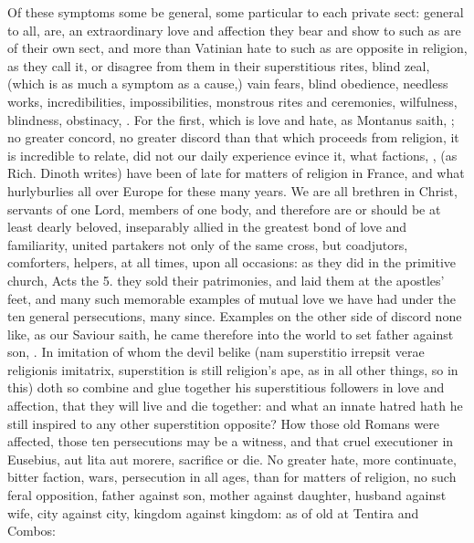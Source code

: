 {Of these symptoms some be general, some particular to each private
sect: general to all, are, an extraordinary love and affection they
bear and show to such as are of their own sect, and more than Vatinian
hate to such as are opposite in religion, as they call it, or disagree
from them in their superstitious rites, blind zeal, (which is as much a
symptom as a cause,) vain fears, blind obedience, needless works,
incredibilities, impossibilities, monstrous rites and ceremonies,
wilfulness, blindness, obstinacy, \etc{}. For the first, which is love and
hate, as Montanus saith, ; no
greater concord, no greater discord than that which proceeds from
religion, it is incredible to relate, did not our daily experience
evince it, what factions, , (as Rich. Dinoth writes) have been of late for matters of religion in France, and
what hurlyburlies all over Europe for these many years.  We are all brethren in
Christ, servants of one Lord, members of one body, and therefore are or
should be at least dearly beloved, inseparably allied in the greatest
bond of love and familiarity, united partakers not only of the same
cross, but coadjutors, comforters, helpers, at all times, upon all
occasions: as they did in the primitive church, Acts the 5. they sold
their patrimonies, and laid them at the apostles' feet, and many such
memorable examples of mutual love we have had under the ten general
persecutions, many since. Examples on the other side of discord none
like, as our Saviour saith, he came therefore into the world to set
father against son, \etc{}. In imitation of whom the devil belike
(nam superstitio irrepsit verae religionis imitatrix,
superstition is still religion's ape, as in all other things, so in
this) doth so combine and glue together his superstitious followers in
love and affection, that they will live and die together: and what an
innate hatred hath he still inspired to any other superstition
opposite? How those old Romans were affected, those ten persecutions
may be a witness, and that cruel executioner in Eusebius, aut lita aut
morere, sacrifice or die. No greater hate, more continuate, bitter
faction, wars, persecution in all ages, than for matters of religion,
no such feral opposition, father against son, mother against daughter,
husband against wife, city against city, kingdom against kingdom: as of
old at Tentira and Combos:

}
